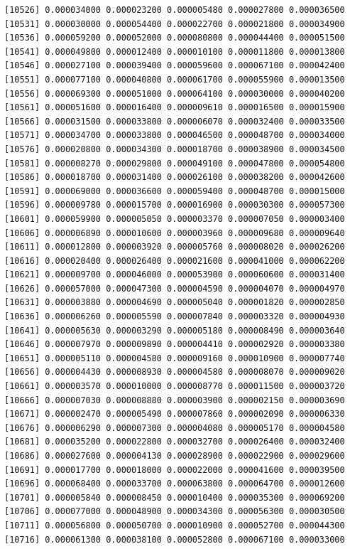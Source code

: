 \documentclass[]{article}
\begin{document}
\begin{verbatim}
[10526] 0.000034000 0.000023200 0.000005480 0.000027800 0.000036500
[10531] 0.000030000 0.000054400 0.000022700 0.000021800 0.000034900
[10536] 0.000059200 0.000052000 0.000080800 0.000044400 0.000051500
[10541] 0.000049800 0.000012400 0.000010100 0.000011800 0.000013800
[10546] 0.000027100 0.000039400 0.000059600 0.000067100 0.000042400
[10551] 0.000077100 0.000040800 0.000061700 0.000055900 0.000013500
[10556] 0.000069300 0.000051000 0.000064100 0.000030000 0.000040200
[10561] 0.000051600 0.000016400 0.000009610 0.000016500 0.000015900
[10566] 0.000031500 0.000033800 0.000006070 0.000032400 0.000033500
[10571] 0.000034700 0.000033800 0.000046500 0.000048700 0.000034000
[10576] 0.000020800 0.000034300 0.000018700 0.000038900 0.000034500
[10581] 0.000008270 0.000029800 0.000049100 0.000047800 0.000054800
[10586] 0.000018700 0.000031400 0.000026100 0.000038200 0.000042600
[10591] 0.000069000 0.000036600 0.000059400 0.000048700 0.000015000
[10596] 0.000009780 0.000015700 0.000016900 0.000030300 0.000057300
[10601] 0.000059900 0.000005050 0.000003370 0.000007050 0.000003400
[10606] 0.000006890 0.000010600 0.000003960 0.000009680 0.000009640
[10611] 0.000012800 0.000003920 0.000005760 0.000008020 0.000026200
[10616] 0.000020400 0.000026400 0.000021600 0.000041000 0.000062200
[10621] 0.000009700 0.000046000 0.000053900 0.000060600 0.000031400
[10626] 0.000057000 0.000047300 0.000004590 0.000004070 0.000004970
[10631] 0.000003880 0.000004690 0.000005040 0.000001820 0.000002850
[10636] 0.000006260 0.000005590 0.000007840 0.000003320 0.000004930
[10641] 0.000005630 0.000003290 0.000005180 0.000008490 0.000003640
[10646] 0.000007970 0.000009890 0.000004410 0.000002920 0.000003380
[10651] 0.000005110 0.000004580 0.000009160 0.000010900 0.000007740
[10656] 0.000004430 0.000008930 0.000004580 0.000008070 0.000009020
[10661] 0.000003570 0.000010000 0.000008770 0.000011500 0.000003720
[10666] 0.000007030 0.000008880 0.000003900 0.000002150 0.000003690
[10671] 0.000002470 0.000005490 0.000007860 0.000002090 0.000006330
[10676] 0.000006290 0.000007300 0.000004080 0.000005170 0.000004580
[10681] 0.000035200 0.000022800 0.000032700 0.000026400 0.000032400
[10686] 0.000027600 0.000004130 0.000028900 0.000022900 0.000029600
[10691] 0.000017700 0.000018000 0.000022000 0.000041600 0.000039500
[10696] 0.000068400 0.000033700 0.000063800 0.000064700 0.000012600
[10701] 0.000005840 0.000008450 0.000010400 0.000035300 0.000069200
[10706] 0.000077000 0.000048900 0.000034300 0.000056300 0.000030500
[10711] 0.000056800 0.000050700 0.000010900 0.000052700 0.000044300
[10716] 0.000061300 0.000038100 0.000052800 0.000067100 0.000033000

\end{verbatim}
\end{document}
